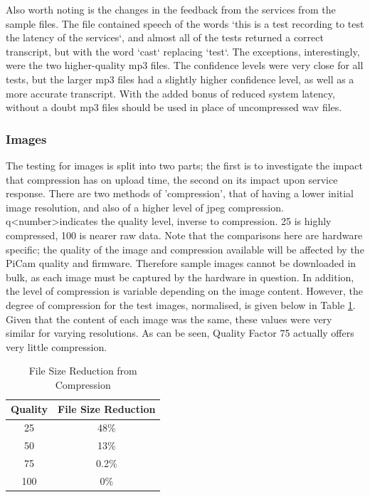 \documentclass{article}
\begin{document}
Also worth noting is the changes in the feedback from the services from the sample files. The file contained speech of the words `this is a test recording to test the latency of the services`, and almost all of the tests returned a correct transcript, but with the word `cast` replacing `test`. The exceptions, interestingly, were the two higher-quality mp3 files. The confidence levels were very close for all tests, but the larger mp3 files had a slightly higher confidence level, as well as a more accurate transcript. With the added bonus of reduced system latency, without a doubt mp3 files should be used in place of uncompressed wav files.

\subsubsection{Images}
The testing for images is split into two parts; the first is to investigate the impact that compression has on upload time, the second on its impact upon service response. There are two methods of 'compression', that of having a lower initial image resolution, and also of a higher level of jpeg compression. q\textless number\textgreater indicates the quality level, inverse to compression. 25 is highly compressed, 100 is nearer raw data. Note that the comparisons here are hardware specific; the quality of the image and compression available will be affected by the PiCam quality and firmware. Therefore sample images cannot be downloaded in bulk, as each image must be captured by the hardware in question. In addition, the level of compression is variable depending on the image content. However, the degree of compression for the test images, normalised, is given below in Table \ref{compressionSize}. Given that the content of each image was the same, these values were very similar for varying resolutions. As can be seen, Quality Factor 75 actually offers very little compression. 
\begin{table}[H]
\caption{File Size Reduction from Compression\label{compressionSize}}
\centering
\begin{tabular}{| c | c |}
\hline
Quality & File Size Reduction\\ \hline
25 & 48\% \\ \hline
50 & 13\% \\ \hline
75 & 0.2\% \\ \hline
100 & 0\% \\ \hline
\end{tabular}
\end{table}
\end{document}
